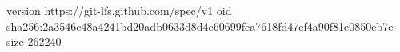version https://git-lfs.github.com/spec/v1
oid sha256:2a3546c48a4241bd20adb0633d8d4c60699fca7618fd47ef4a90f81e0850eb7e
size 262240
